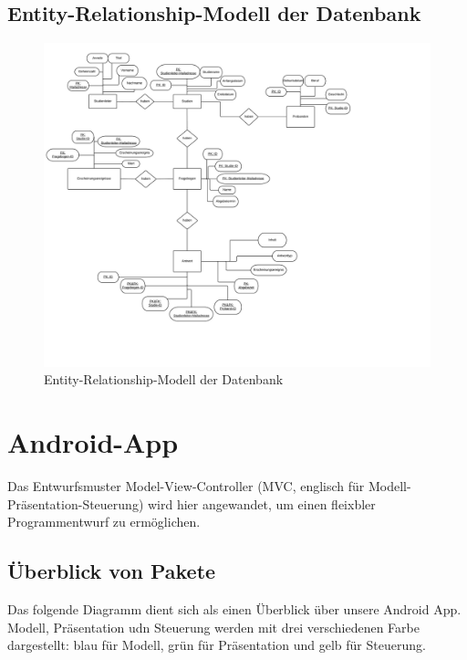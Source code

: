 \documentclass[a4paper]{scrreprt}
\begin{document}
        \newpage
        \section{Entity-Relationship-Modell der Datenbank}
            \begin{figure}[ht]
                \centering
                \includegraphics[scale = 0.13]{PSE_Datenbank_ERM.jpeg}
                \caption{Entity-Relationship-Modell der Datenbank}
            \end{figure}


    \newpage
    \chapter{Android-App}

        Das Entwurfsmuster Model-View-Controller (MVC, englisch für Modell-Präsentation-Steuerung) wird hier angewandet, um einen fleixbler Programmentwurf zu ermöglichen.


        \vspace*{1cm}
        \section{Überblick von Pakete}

            Das folgende Diagramm dient sich als einen Überblick über unsere Android App. Modell, Präsentation udn Steuerung werden mit drei verschiedenen Farbe dargestellt: blau für Modell, grün für Präsentation und gelb für Steuerung.
\end{document}
